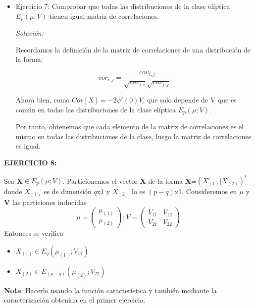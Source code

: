 \documentclass{article}
\theoremstyle{theorem-style}  %
\theoremstyle{definition}
\theoremstyle{example-style}
\begin{document}
\begin{itemize}
			\item Ejercicio 7: Comprobar que todas las distribuciones de la clase elíptica $E_p(\mu; V)$ tienen igual matriz de correlaciones.
			
			\textit{Solución:}
			
			Recordamos la definición de la matriz de correlaciones de una distribución de la forma:
			
			\[
				cor_{i,j} = \frac{cov_{i,j}}{\sqrt{cov_{i,i}} \sqrt{cov_{j,j}}}
			\]
		
			Ahora bien, como $Cov[X] = -2 \psi'(0) V$, que solo depende de V que es común en todas las distribuciones de la clase elíptica $E_p(\mu; V)$.
			
			Por tanto, obtenemos que cada elemento de la matriz de correlaciones es el mismo en todas las distribuciones de la clase, luego la matriz de correlaciones es igual.
			
		\end{itemize}
		
		\textbf{EJERCICIO 8:}
		
		Sea \textbf{X}$\in E_p(\mu; V)$. Particionemos el vector \textbf{X} de la forma \textbf{X}=$(X^t_{(1)}|X^t_{(2)})^t$ donde $X_{(1)}$ es de dimensión $q$x1 y $X_{(2)}$ lo es $(p-q)$x1. Consideremos en $\mu$ y \textbf{V} las particiones inducidas
		$$\mu = \left( \begin{array}{c}
						\mu_{(1)} \\ \mu_{(2)}
						\end{array}\right);
		V = \left( \begin{array}{cc}
					V_{11} & V_{12} \\ V_{21} & V_{22}
					\end{array}\right)$$
		Entonces se verifica
		\begin{itemize}
			\item $X_{(1)} \in E_q(\mu_{(1)}; V_{11})$
			\item $X_{(2)} \in E_{(p-q)}(\mu_{(2)}; V_{22})$
		\end{itemize}
		
		\textbf{Nota}: Hacerlo usando la función característica y también mediante la caracterización obtenida en el primer ejercicio.
		
\end{document}
